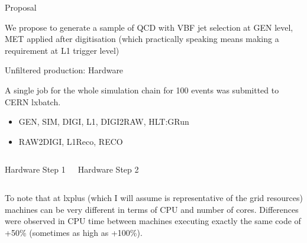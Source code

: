 \documentclass[8pt]{beamer}
\begin{document}
\begin{frame}{Proposal}

We propose to generate a sample of QCD with VBF jet selection at GEN level, MET applied after digitisation (which practically speaking means making a requirement at L1 trigger level)

\end{frame}

\begin{frame}{Unfiltered production: Hardware}

A single job for the whole simulation chain for 100 events was submitted to CERN lxbatch.
\begin{itemize}
  \item GEN, SIM, DIGI, L1, DIGI2RAW, HLT:GRun
  \item RAW2DIGI, L1Reco, RECO
\end{itemize}

\begin{columns}

  \centering
  
  \begin{block}{Hardware Step 1}
  
  \end{block}
  
  \centering
  
  \begin{block}{Hardware Step 2}
  
  \end{block}
  
\end{columns}


To note that at lxplus (which I will assume is representative of the grid resources) machines can be very different in terms of CPU and number of cores. Differences were observed in CPU time between machines executing exactly the same code of +50\% (sometimes as high as +100\%).

\end{frame}
\end{document}
